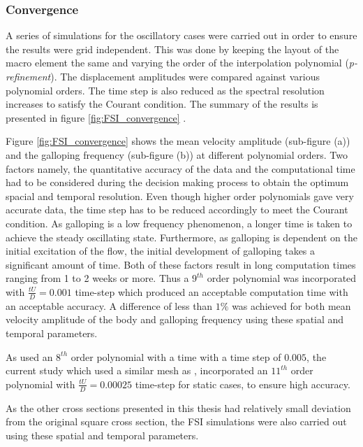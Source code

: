  
 
 
 

\subsubsection{Convergence}

A series of simulations for the oscillatory cases were carried out in order to ensure the results were grid independent. This was done by keeping the layout of the macro element the same and varying the order of the interpolation polynomial (\emph{p-refinement}). The displacement amplitudes were compared against various polynomial orders. The time step is also reduced as the spectral resolution increases to satisfy the Courant condition. The summary of the results is presented in figure \ref{fig:FSI_convergence} .



Figure \ref{fig:FSI_convergence} shows the mean velocity amplitude (sub-figure (a)) and the galloping frequency (sub-figure (b)) at different polynomial orders. Two factors namely, the quantitative accuracy of the data and the computational time had to be considered during the decision making process to obtain the optimum spacial and temporal resolution. Even though higher order polynomials gave very accurate data, the time step has to be reduced accordingly to meet the Courant condition. As galloping is a low frequency phenomenon, a longer time is taken to achieve the steady oscillating state. Furthermore, as galloping is dependent on the initial excitation of the flow, the initial development of galloping takes a significant amount of time. Both of these factors result in long computation times ranging from 1 to 2 weeks or more. Thus a $9^{th}$ order polynomial was incorporated with $\frac{tU}{D}=0.001$ time-step which produced an acceptable computation time with an acceptable accuracy. A difference of less than $1\%$ was achieved for both mean velocity amplitude  of the body and galloping frequency using these spatial and temporal parameters.

As \citet{Leontini2013}  used an $8^{th}$ order polynomial with a time with a time step of $0.005$, the current study which used a similar mesh as \citet{Leontini2013}, incorporated an $11^{th}$ order polynomial with $\frac{tU}{D}=0.00025$ time-step for static cases, to ensure high accuracy.

As the other cross sections presented in this thesis had relatively small deviation from the original square cross section, the FSI simulations were also carried out using these spatial and temporal parameters.     















